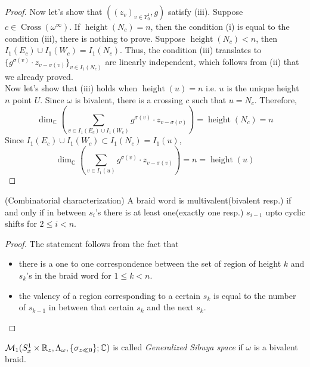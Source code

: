 \begin{proof}
Now let's show that $((z_v)_{v\in\Upsilon_0^1},g)$ satisfy (\Rn{3}). Suppose $c\in \operatorname{Cross}(\omega^\infty)$. If $\operatorname{height}(N_c)=n$, then the condition (\Rn{1}) is equal to the condition (\Rn{3}), there is nothing to prove. Suppose $\operatorname{height}(N_c)<n$, then $I_1(E_c)\cup I_1(W_c)=I_1(N_c)$. Thus, the condition (\Rn{3}) translates to $\{g^{\sigma(v)}\cdot z_{v-\sigma(v)}\}_{v\in I_1(N_c)}$ are linearly independent, which follows from (\Rn{2}) that we already proved.\\
Now let's show that (\Rn{3}) holds when $\operatorname{height}(u)=n$ i.e. $u$ is the unique height $n$ point $U$. Since $\omega$ is bivalent, there is a crossing $c$ such that $u=N_c$. Therefore,
\[
\operatorname{dim}_\mathbb{C}(\sum_{v\in I_1(E_c)\cup I_1(W_c)} g^{\sigma(v)}\cdot z_{v-\sigma(v)}) = \operatorname{height}(N_c) = n
\]
Since $I_1(E_c)\cup I_1(W_c)\subset I_1(N_c)=I_1(u)$, 
\[
\operatorname{dim}_\mathbb{C}(\sum_{v\in I_1(u)} g^{\sigma(v)}\cdot z_{v-\sigma(v)}) = n=\operatorname{height}(u)
\]
\end{proof}

\begin{theorem}
(Combinatorial characterization) A braid word is multivalent(bivalent resp.) if and only if in between $s_i$'s there is at least one(exactly one resp.) $s_{i-1}$ upto cyclic shifts for $2\leq i<n$.
\end{theorem}
\begin{proof}
The statement follows from the fact that 
\begin{itemize}
\item there is a one to one correspondence between the set of region of height $k$ and $s_k$'s in the braid word for $1\leq k<n$.

\item the valency of a region corresponding to a certain $s_k$ is equal to the number of $s_{k-1}$ in between that certain $s_k$ and the next $s_k$.
\end{itemize}
\end{proof}

\begin{definition}
$\mathcal{M}_1(S^1_x \times \mathbb{R}_z,\Lambda_\omega,\{\sigma_{z\ll 0}\};\mathbb{C})$ is called \emph{Generalized Sibuya space} if $\omega$ is a bivalent braid.
\end{definition}

   
